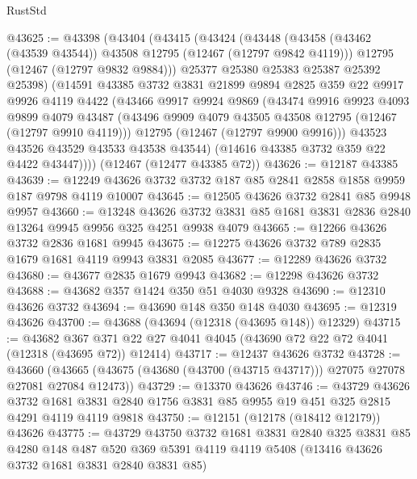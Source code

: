 \begin{lexlean}{RustStd}
\begin{coremodule}
@43625 := @43398
    (@43404
      (@43415
        (@43424
          (@43448
            (@43458 (@43462 (@43539 @43544)) @43508 @12795 (@12467 (@12797 @9842 @4119)))
            @12795
            (@12467 (@12797 @9832 @9884)))
          @25377
          @25380
          @25383
          @25387
          @25392
          @25398)
        (@14591
          @43385
          @3732
          @3831
          @21899
          @9894
          @2825
          @359
          @22
          @9917
          @9926
          @4119
          @4422
          (@43466
            @9917
            @9924
            @9869
            (@43474
              @9916
              @9923
              @4093
              @9899
              @4079
              @43487
              (@43496 @9909 @4079 @43505 @43508 @12795 (@12467 (@12797 @9910 @4119)))
              @12795
              (@12467 (@12797 @9900 @9916)))
            @43523
            @43526
            @43529
            @43533
            @43538
            @43544)
          (@14616 @43385 @3732 @359 @22 @4422 @43447))))
    (@12467 (@12477 @43385 @72))
@43626 := @12187 @43385
@43639 := @12249 @43626 @3732 @3732 @187 @85 @2841 @2858 @1858 @9959 @187 @9798 @4119 @10007
@43645 := @12505 @43626 @3732 @2841 @85 @9948 @9957
@43660 := @13248
    @43626
    @3732
    @3831
    @85
    @1681
    @3831
    @2836
    @2840
    @13264
    @9945
    @9956
    @325
    @4251
    @9938
    @4079
@43665 := @12266 @43626 @3732 @2836 @1681 @9945
@43675 := @12275 @43626 @3732 @789 @2835 @1679 @1681 @4119 @9943 @3831 @2085
@43677 := @12289 @43626 @3732
@43680 := @43677 @2835 @1679 @9943
@43682 := @12298 @43626 @3732
@43688 := @43682 @357 @1424 @350 @51 @4030 @9328
@43690 := @12310 @43626 @3732
@43694 := @43690 @148 @350 @148 @4030
@43695 := @12319 @43626
@43700 := @43688 (@43694 (@12318 (@43695 @148)) @12329)
@43715 := @43682
    @367
    @371
    @22
    @27
    @4041
    @4045
    (@43690 @72 @22 @72 @4041 (@12318 (@43695 @72)) @12414)
@43717 := @12437 @43626 @3732
@43728 := @43660
    (@43665 (@43675 (@43680 (@43700 (@43715 @43717))) @27075 @27078 @27081 @27084 @12473))
@43729 := @13370 @43626
@43746 := @43729
    @43626
    @3732
    @1681
    @3831
    @2840
    @1756
    @3831
    @85
    @9955
    @19
    @451
    @325
    @2815
    @4291
    @4119
    @4119
    @9818
@43750 := @12151 (@12178 (@18412 @12179)) @43626
@43775 := @43729
    @43750
    @3732
    @1681
    @3831
    @2840
    @325
    @3831
    @85
    @4280
    @148
    @487
    @520
    @369
    @5391
    @4119
    @4119
    @5408
    (@13416 @43626 @3732 @1681 @3831 @2840 @3831 @85)

\end{coremodule}
\end{lexlean}
